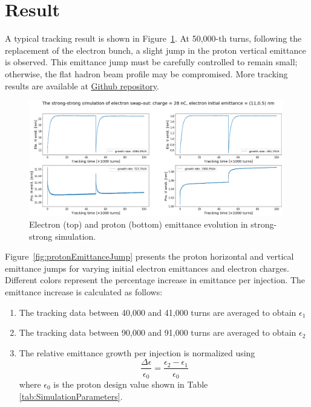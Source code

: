 \documentclass{article}
\begin{document}
\section{Result}
A typical tracking result is shown in Figure~\ref{fig:ssTrackingExample}.
At 50,000-th turns, following the replacement of the electron bunch, a slight jump 
in the proton vertical emittance is observed. This emittance jump must be 
carefully controlled to remain small; otherwise, the flat hadron beam profile 
may be compromised.
More tracking results are available at \href{https://github.com/xud929/ESR_injection_swapOut/tree/main/pic}{Github repository}.
\begin{figure}
    \centering
    \includegraphics[width=0.99\textwidth]{pic/28nC_track/11_0.5.png}
    \caption{Electron (top) and proton (bottom) emittance evolution in strong-strong simulation.}
    \label{fig:ssTrackingExample}
\end{figure}

Figure~\ref{fig:protonEmittanceJump} presents the proton horizontal and vertical 
emittance jumps for varying initial electron emittances and electron charges. 
Different colors represent the percentage increase in emittance per injection.
The emittance increase is calculated as follows:
\begin{enumerate}[(1)]
    \item The tracking data between 40,000 and 41,000 turns are averaged to obtain $\epsilon_1$
    \item The tracking data between 90,000 and 91,000 turns are averaged to obtain $\epsilon_2$
    \item The relative emittance growth per injection is normalized using
    \begin{displaymath}
    \frac{\Delta \epsilon}{\epsilon_0}=\frac{\epsilon_2-\epsilon_1}{\epsilon_0}
    \end{displaymath}
    where $\epsilon_0$ is the proton design value shown in Table \ref{tab:SimulationParameters}.
\end{enumerate}
\end{document}
